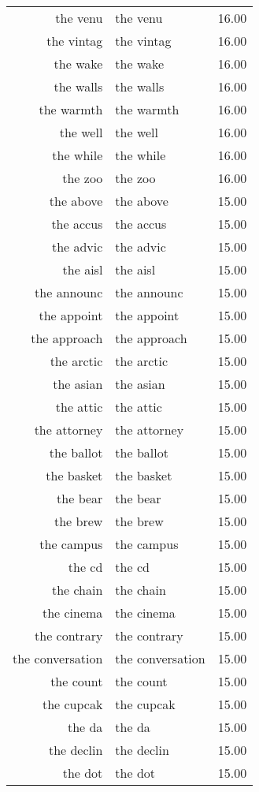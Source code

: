 \begin{table}[ht]
\begin{tabular}{rlr}
  the venu & the venu & 16.00 \\ 
  the vintag & the vintag & 16.00 \\ 
  the wake & the wake & 16.00 \\ 
  the walls & the walls & 16.00 \\ 
  the warmth & the warmth & 16.00 \\ 
  the well & the well & 16.00 \\ 
  the while & the while & 16.00 \\ 
  the zoo & the zoo & 16.00 \\ 
  the above & the above & 15.00 \\ 
  the accus & the accus & 15.00 \\ 
  the advic & the advic & 15.00 \\ 
  the aisl & the aisl & 15.00 \\ 
  the announc & the announc & 15.00 \\ 
  the appoint & the appoint & 15.00 \\ 
  the approach & the approach & 15.00 \\ 
  the arctic & the arctic & 15.00 \\ 
  the asian & the asian & 15.00 \\ 
  the attic & the attic & 15.00 \\ 
  the attorney & the attorney & 15.00 \\ 
  the ballot & the ballot & 15.00 \\ 
  the basket & the basket & 15.00 \\ 
  the bear & the bear & 15.00 \\ 
  the brew & the brew & 15.00 \\ 
  the campus & the campus & 15.00 \\ 
  the cd & the cd & 15.00 \\ 
  the chain & the chain & 15.00 \\ 
  the cinema & the cinema & 15.00 \\ 
  the contrary & the contrary & 15.00 \\ 
  the conversation & the conversation & 15.00 \\ 
  the count & the count & 15.00 \\ 
  the cupcak & the cupcak & 15.00 \\ 
  the da & the da & 15.00 \\ 
  the declin & the declin & 15.00 \\ 
  the dot & the dot & 15.00 \\ 

\end{tabular}
\end{table}
